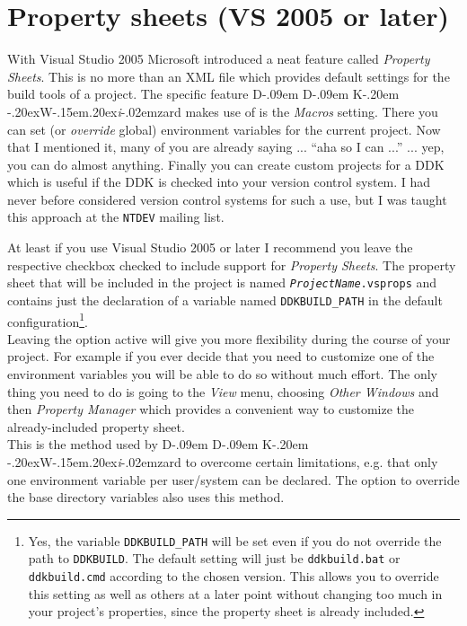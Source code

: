 \documentclass[a4paper,titlepage]{report}
\def\ddkwiz{D\kern-.09em D\kern-.09em K\kern-.20em \raise-.20ex\hbox{W}\kern-.15em\raise.20ex\hbox{\it{i}}\kern-.02em{zard}}
\begin{document}
\section{Property sheets (VS 2005 or later)}
\label{sec:propsheets}
With Visual Studio 2005 Microsoft introduced a neat feature called \emph{Property Sheets}.
This is no more than an XML file which provides default settings for the build tools
of a project. The specific feature \ddkwiz{} makes use of is the \emph{Macros}
setting. There you can set (or \emph{override} global) environment variables for the
current project. Now that I mentioned it, many of you are already saying ... ``aha
so I can ...'' ... yep, you can do almost anything. Finally you can create custom
projects for a DDK which is useful if the DDK is checked into your version control
system. I had never before considered version control systems for such a use, but
I was taught this approach at the \texttt{NTDEV} mailing list.

At least if you use Visual Studio 2005 or later I recommend you leave the respective checkbox
checked to include support for \emph{Property Sheets}. The property sheet that will
be included in the project is named \texttt{\emph{ProjectName}.vsprops} and contains
just the declaration of a variable named \texttt{DDKBUILD\_PATH} in the default
configuration\footnote{Yes, the variable \texttt{DDKBUILD\_PATH} will be set even
if you do not override the path to \texttt{DDKBUILD}. The default setting will
just be \texttt{ddkbuild.bat} or \texttt{ddkbuild.cmd} according to the chosen
version. This allows you to override this setting as well as others at a later
point without changing too much in your project's properties, since the property
sheet is already included.}.\\

Leaving the option active will give you more
flexibility during the course of your project. For example if you ever decide
that you need to customize one of the environment variables you will be able
to do so without much effort. The only thing you need to do is going to the
\emph{View} menu, choosing \emph{Other Windows} and then \emph{Property Manager}
which provides a convenient way to customize the already-included property sheet.\\

This is the method used by \ddkwiz{} to overcome certain limitations, e.g.
that only one environment variable per user/system can be declared. The option
to override the base directory variables also uses this method.
\end{document}
